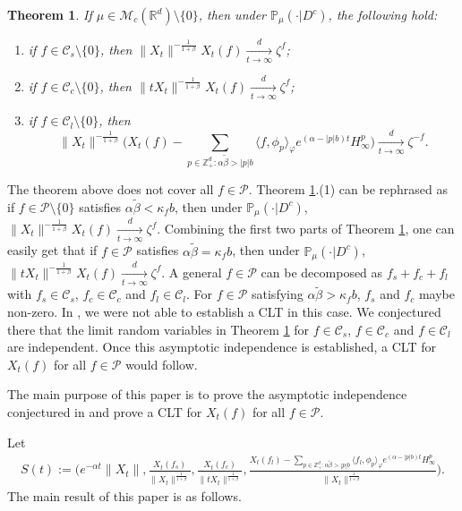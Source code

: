 \documentclass[12pt,a4paper]{amsart}
\theoremstyle{plain}
\newtheorem{thm}{Theorem}[section]
\theoremstyle{definition}
\numberwithin{equation}{section}
\begin{document}
\begin{thm}
\label{thm:RSSZ}
	If $\mu\in \mathcal M_c(\mathbb R^d)\setminus \{0\}$, then under $\mathbb{P}_{\mu}(\cdot|D^c)$, the following hold:
\begin{enumerate}
\item \label{thm:M:1}
  	if $f\in \mathcal C_s\setminus\{0\}$, then $\|X_t\|^{- \frac{1}{1+\beta}} X_t(f)  \xrightarrow[t\to \infty]{d} \zeta^f$;
\item \label{thm:M:2}
  	if $f\in \mathcal C_c\setminus\{0\}$, then $ \|t X_t\|^{-\frac{1}{1+\beta}} X_t(f) \xrightarrow[t\to \infty]{d} \zeta^f$;
\item \label{thm:M:3}
  	if $f\in \mathcal C_l\setminus\{0\}$, then
\[
    \|X_t\|^{-\frac{1}{1+\beta}} \Big( X_t(f) - \sum_{p\in \mathbb Z^d_+:\alpha \tilde \beta>|p|b}\langle f,\phi_p\rangle_\varphi e^{(\alpha-|p|b)t}H^p_{\infty}\Big)
    \xrightarrow[t\to \infty]{d}
    \zeta^{-f}.
\]
\end{enumerate}
\end{thm}

The theorem above does not cover all $f\in \mathcal P$.
	Theorem \ref{thm:RSSZ}.(1) can be rephrased as if $f\in \mathcal P\setminus\{0\}$ satisfies   $\alpha \tilde \beta < \kappa_f b$, then  under $\mathbb{P}_{\mu}(\cdot|D^c)$, $\|X_t\|^{- \frac{1}{1+\beta}} X_t(f)  \xrightarrow[t\to \infty]{d} \zeta^f$.
	Combining the first two parts of Theorem \ref{thm:RSSZ}, one can easily get that  if $f\in \mathcal P$ satisfies   $\alpha \tilde \beta = \kappa_f b$, then  under $\mathbb{P}_{\mu}(\cdot|D^c)$, $\|t X_t\|^{-\frac{1}{1+\beta}} X_t(f) \xrightarrow[t\to \infty]{d} \zeta^f$.
	A general  $f \in \mathcal P$ can be decomposed as $f_s + f_c + f_l$ with $f_s \in \mathcal C_s$, $f_c \in \mathcal C_c$ and $f_l \in \mathcal C_l$.
	For $f\in  \mathcal P$ satisfying $\alpha \tilde \beta > \kappa_f b$, $f_s$ and $f_c$
	maybe non-zero. In \cite{RenSongSunZhao2019Stable}, we were not able to
	establish a CLT in this case. We conjectured there that the limit random variables in Theorem \ref{thm:RSSZ} for $ f\in \mathcal C_s$, $f\in \mathcal C_c$ and $ f\in \mathcal C_l$ are independent. Once this asymptotic independence is established, a CLT for $ X_t(f)$ for all $f\in  \mathcal P$ would follow.
	
	The main purpose of this paper is to prove the asymptotic independence conjectured in
	\cite{RenSongSunZhao2019Stable} and prove a CLT for $ X_t(f)$ for all $f\in  \mathcal P$.

Let
\begin{align}
S(t):=\Bigg(e^{-\alpha t}\|X_t\|, \frac{X_t(f_s)}{\|X_t\|^{\frac{1}{1+\beta}}},\frac{X_t(f_c)}{\|tX_t\|^{\frac{1}{1+\beta}}},\frac{ X_t(f_l) - \sum_{p\in \mathbb Z^d_+:\alpha \tilde \beta>|p|b}\langle f_l,\phi_p\rangle_\varphi e^{(\alpha-|p|b)t}H^p_{\infty}}{\|X_t\|^{\frac{1}{1+\beta}}}\Bigg).
\end{align}
The main result of this paper is as follows.
\end{document}
